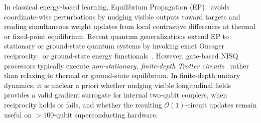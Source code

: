 \documentclass[11pt]{article}
\begin{document}
In classical energy-based learning, Equilibrium Propagation (EP)~\cite{scellier2017ep,laydevant2024ep,scellier2024ep} avoids coordinate-wise perturbations by nudging visible outputs toward targets and reading simultaneous weight updates from local contrastive differences at thermal or fixed-point equilibrium. Recent quantum generalizations extend EP to stationary or ground-state quantum systems by invoking exact Onsager reciprocity~\cite{wanjura2025qep} or ground-state energy functionals~\cite{scellier2026qep}. However, gate-based NISQ processors typically execute \emph{non-stationary, finite-depth Trotter circuits}~\cite{farhi2014qaoa} rather than relaxing to thermal or ground-state equilibrium. In finite-depth unitary dynamics, it is unclear a priori whether nudging visible longitudinal fields provides a valid gradient surrogate for internal two-qubit couplers, when reciprocity holds or fails, and whether the resulting $\mathcal{O}(1)$-circuit updates remain useful on $>100$-qubit superconducting hardware.
\end{document}
